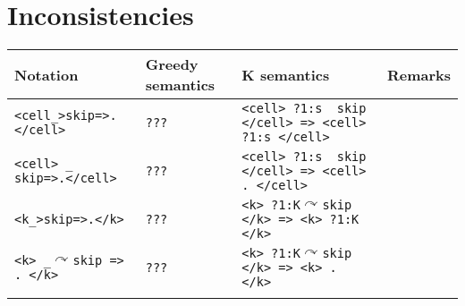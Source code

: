 \documentclass[draft]{article}
\newcommand{\kra}{\curvearrowright}
\begin{document}
\section{Inconsistencies}

\begin{tabular}{|l|l|l|l|}
\hline
Notation & Greedy semantics & K semantics & Remarks \\
\hline
\verb'<cell_>skip=>.</cell>'
&
\verb'??? '
&
\verb'<cell> ?1:s  skip </cell> => <cell> ?1:s </cell>'
&
\\
\verb'<cell> _ skip=>.</cell>'
&
\verb'??? '
&
\verb'<cell> ?1:s  skip </cell> => <cell> . </cell>'
&
\\
\verb'<k_>skip=>.</k>'
&
\verb'??? '
&
\verb'<k> ?1:K'$\kra$\verb'skip </k> => <k> ?1:K </k>'
&
\\
\verb'<k> _'$\kra$\verb'skip => . </k>'
&
\verb'??? '
&
\verb'<k> ?1:K'$\kra$\verb'skip </k> => <k> .  </k>'
&
\\
\hline
&
&
&
\\
\hline
\end{tabular}

 
\end{document}
